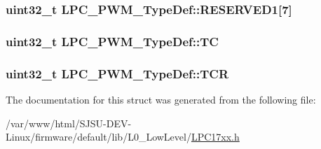 \subsubsection[{\texorpdfstring{R\+E\+S\+E\+R\+V\+E\+D1}{RESERVED1}}]{\setlength{\rightskip}{0pt plus 5cm}uint32\+\_\+t L\+P\+C\+\_\+\+P\+W\+M\+\_\+\+Type\+Def\+::\+R\+E\+S\+E\+R\+V\+E\+D1\mbox{[}7\mbox{]}}\hypertarget{structLPC__PWM__TypeDef_a0a4b673db3962be444e0445e06401519}{}\label{structLPC__PWM__TypeDef_a0a4b673db3962be444e0445e06401519}
\subsubsection[{\texorpdfstring{TC}{TC}}]{ uint32\+\_\+t L\+P\+C\+\_\+\+P\+W\+M\+\_\+\+Type\+Def\+::\+TC}\hypertarget{structLPC__PWM__TypeDef_addc3a8bbc412879ee9681c28d2b2ef5c}{}\label{structLPC__PWM__TypeDef_addc3a8bbc412879ee9681c28d2b2ef5c}
\subsubsection[{\texorpdfstring{T\+CR}{TCR}}]{ uint32\+\_\+t L\+P\+C\+\_\+\+P\+W\+M\+\_\+\+Type\+Def\+::\+T\+CR}\hypertarget{structLPC__PWM__TypeDef_a9b55e114f9f96123677ed8a89d147be7}{}\label{structLPC__PWM__TypeDef_a9b55e114f9f96123677ed8a89d147be7}


The documentation for this struct was generated from the following file\+:\begin{DoxyCompactItemize}
\item 
/var/www/html/\+S\+J\+S\+U-\/\+D\+E\+V-\/\+Linux/firmware/default/lib/\+L0\+\_\+\+Low\+Level/\hyperlink{LPC17xx_8h}{L\+P\+C17xx.\+h}\end{DoxyCompactItemize}

